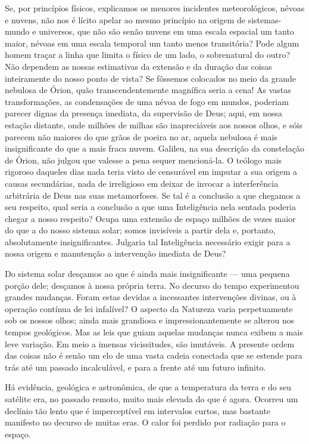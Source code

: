 \documentclass[11pt,a5paper,twoside,openany]{book}
\begin{document}
Se, por princípios físicos, explicamos os menores incidentes meteorológicos, névoas e nuvens, não nos é lícito apelar ao mesmo princípio na origem de sistemas-mundo e universos, que não são senão nuvens em uma escala espacial um tanto maior, névoas em uma escala temporal um tanto menos transitória? Pode algum homem traçar a linha que limita o físico de um lado, o sobrenatural do outro? Não dependem as nossas estimativas da extensão e da duração das coisas inteiramente do nosso ponto de vista? Se fôssemos colocados no meio da grande nebulosa de Órion, quão transcendentemente magnífica seria a cena! As vastas transformações, as condensações de uma névoa de fogo em mundos, poderiam parecer dignas da presença imediata, da supervisão de Deus; aqui, em nossa estação distante, onde milhões de milhas são inapreciáveis aos nossos olhos, e sóis parecem não maiores do que grãos de poeira no ar, aquela nebulosa é mais insignificante do que a mais fraca nuvem. Galileu, na sua descrição da constelação de Órion, não julgou que valesse a pena sequer mencioná-la. O teólogo mais rigoroso daqueles dias nada teria visto de censurável em imputar a sua origem a causas secundárias, nada de irreligioso em deixar de invocar a interferência arbitrária de Deus nas suas metamorfoses. Se tal é a conclusão a que chegamos a seu respeito, qual seria a conclusão a que uma Inteligência nela sentada poderia chegar a nosso respeito? Ocupa uma extensão de espaço milhões de vezes maior do que a do nosso sistema solar; somos invisíveis a partir dela e, portanto, absolutamente insignificantes. Julgaria tal Inteligência necessário exigir para a nossa origem e manutenção a intervenção imediata de Deus?

Do sistema solar desçamos ao que é ainda mais insignificante — uma pequena porção dele; desçamos à nossa própria terra. No decurso do tempo experimentou grandes mudanças. Foram estas devidas a incessantes intervenções divinas, ou à operação contínua de lei infalível? O aspecto da Natureza varia perpetuamente sob os nossos olhos; ainda mais grandiosa e impressionantemente se alterou nos tempos geológicos. Mas as leis que guiam aquelas mudanças nunca exibem a mais leve variação. Em meio a imensas vicissitudes, são imutáveis. A presente ordem das coisas não é senão um elo de uma vasta cadeia conectada que se estende para trás até um passado incalculável, e para a frente até um futuro infinito.

Há evidência, geológica e astronômica, de que a temperatura da terra e do seu satélite era, no passado remoto, muito mais elevada do que é agora. Ocorreu um declínio tão lento que é imperceptível em intervalos curtos, mas bastante manifesto no decurso de muitas eras. O calor foi perdido por radiação para o espaço.
\end{document}
